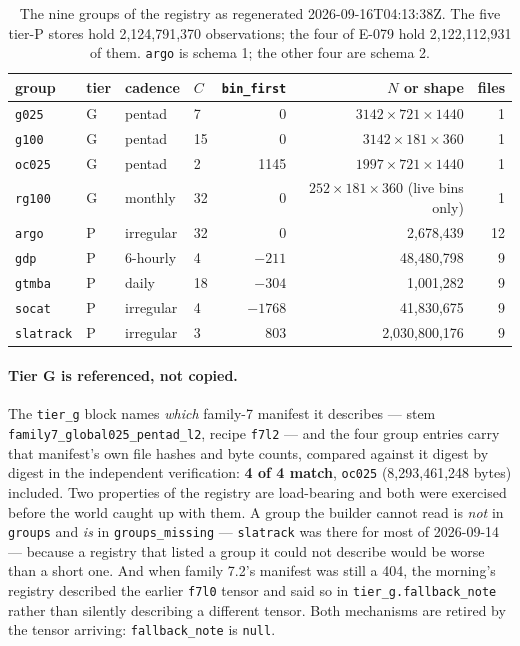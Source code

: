 \documentclass[10pt]{article}
\newcommand{\code}[1]{\texttt{#1}}
\begin{document}
\begin{table}[h]
\centering\setlength{\tabcolsep}{5pt}\footnotesize
\begin{tabular}{@{}llllrrr@{}}
\toprule
group & tier & cadence & $C$ & \code{bin\_first} & $N$ or shape & files \\
\midrule
\code{g025}     & G & pentad    & 7  & 0     & $3142 \times 721 \times 1440$ & 1 \\
\code{g100}     & G & pentad    & 15 & 0     & $3142 \times 181 \times 360$  & 1 \\
\code{oc025}    & G & pentad    & 2  & 1145  & $1997 \times 721 \times 1440$ & 1 \\
\code{rg100}    & G & monthly   & 32 & 0     & $252 \times 181 \times 360$ (live bins only) & 1 \\
\code{argo}     & P & irregular & 32 & 0     & 2,678,439      & 12 \\
\code{gdp}      & P & 6-hourly  & 4  & $-211$  & 48,480,798   & 9 \\
\code{gtmba}    & P & daily     & 18 & $-304$  & 1,001,282    & 9 \\
\code{socat}    & P & irregular & 4  & $-1768$ & 41,830,675   & 9 \\
\code{slatrack} & P & irregular & 3  & 803     & 2,030,800,176 & 9 \\
\bottomrule
\end{tabular}
\caption{The nine groups of the registry as regenerated 2026-09-16T04:13:38Z.
The five tier-P stores hold 2,124,791,370 observations; the four of E-079 hold
2,122,112,931 of them. \code{argo} is schema 1; the other four are schema 2.}
\end{table}

\paragraph{Tier G is referenced, not copied.} The \code{tier\_g} block names
\emph{which} family-7 manifest it describes --- stem
\code{family7\_global025\_pentad\_l2}, recipe \code{f7l2} --- and the four group
entries carry that manifest's own file hashes and byte counts, compared against
it digest by digest in the independent verification: \textbf{4 of 4 match},
\code{oc025} (8,293,461,248 bytes) included. Two properties of the registry are
load-bearing and both were exercised before the world caught up with them. A
group the builder cannot read is \emph{not} in \code{groups} and \emph{is} in
\code{groups\_missing} --- \code{slatrack} was there for most of 2026-09-14 ---
because a registry that listed a group it could not describe would be worse than
a short one. And when family 7.2's manifest was still a 404, the morning's
registry described the earlier \code{f7l0} tensor and said so in
\code{tier\_g.fallback\_note} rather than silently describing a different
tensor. Both mechanisms are retired by the tensor arriving:
\code{fallback\_note} is \code{null}.
\end{document}
